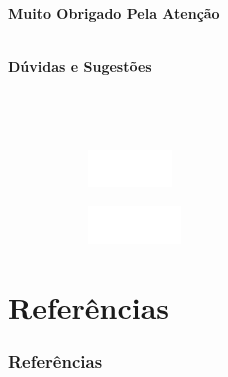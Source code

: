 \documentclass[aspectratio=169,t,xcolor=table]{beamer}
\begin{document}
\begin{frame}
	
	\centering
	\vspace{2cm}
	
	\textbf{\Huge Muito Obrigado Pela Atenção}
	
	\ \\
	
	\textbf{Dúvidas e Sugestões}
	\ \\
	
	 \\
	 \\
	 \\
	\vspace{2cm}
	\begin{figure}
		\centering
		\begin{subfigure}{0.2\textwidth}
			\centering
			\includegraphics[height=1cm]{lib/logos/icmc.png}
		\end{subfigure}
		\qquad 
		\begin{subfigure}{0.2\textwidth}
			\centering
			\includegraphics[height=1cm]{lib/logos/logo_usp_white.png}
		\end{subfigure}
		
	\end{figure}
	
\end{frame}



\section{Referências}
\begin{frame}[allowframebreaks]
	\frametitle{Referências}
	\smaller
	
	\nocite{}
	
\end{frame}
\end{document}
